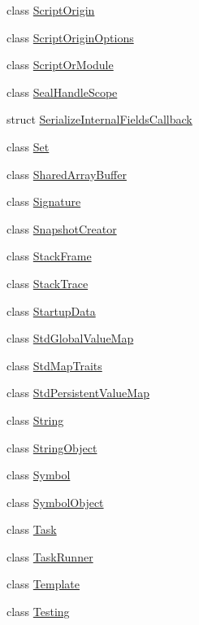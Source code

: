 \begin{DoxyCompactItemize}
\item 
class \mbox{\hyperlink{classv8_1_1ScriptOrigin}{Script\+Origin}}
\item 
class \mbox{\hyperlink{classv8_1_1ScriptOriginOptions}{Script\+Origin\+Options}}
\item 
class \mbox{\hyperlink{classv8_1_1ScriptOrModule}{Script\+Or\+Module}}
\item 
class \mbox{\hyperlink{classv8_1_1SealHandleScope}{Seal\+Handle\+Scope}}
\item 
struct \mbox{\hyperlink{structv8_1_1SerializeInternalFieldsCallback}{Serialize\+Internal\+Fields\+Callback}}
\item 
class \mbox{\hyperlink{classv8_1_1Set}{Set}}
\item 
class \mbox{\hyperlink{classv8_1_1SharedArrayBuffer}{Shared\+Array\+Buffer}}
\item 
class \mbox{\hyperlink{classv8_1_1Signature}{Signature}}
\item 
class \mbox{\hyperlink{classv8_1_1SnapshotCreator}{Snapshot\+Creator}}
\item 
class \mbox{\hyperlink{classv8_1_1StackFrame}{Stack\+Frame}}
\item 
class \mbox{\hyperlink{classv8_1_1StackTrace}{Stack\+Trace}}
\item 
class \mbox{\hyperlink{classv8_1_1StartupData}{Startup\+Data}}
\item 
class \mbox{\hyperlink{classv8_1_1StdGlobalValueMap}{Std\+Global\+Value\+Map}}
\item 
class \mbox{\hyperlink{classv8_1_1StdMapTraits}{Std\+Map\+Traits}}
\item 
class \mbox{\hyperlink{classv8_1_1StdPersistentValueMap}{Std\+Persistent\+Value\+Map}}
\item 
class \mbox{\hyperlink{classv8_1_1String}{String}}
\item 
class \mbox{\hyperlink{classv8_1_1StringObject}{String\+Object}}
\item 
class \mbox{\hyperlink{classv8_1_1Symbol}{Symbol}}
\item 
class \mbox{\hyperlink{classv8_1_1SymbolObject}{Symbol\+Object}}
\item 
class \mbox{\hyperlink{classv8_1_1Task}{Task}}
\item 
class \mbox{\hyperlink{classv8_1_1TaskRunner}{Task\+Runner}}
\item 
class \mbox{\hyperlink{classv8_1_1Template}{Template}}
\item 
class \mbox{\hyperlink{classv8_1_1Testing}{Testing}}
\item 

\end{DoxyCompactItemize}
